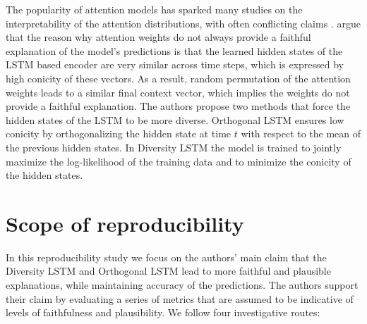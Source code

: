 The popularity of attention models has sparked many studies on the interpretability of the attention distributions, with often conflicting claims \citep{jain-wallace-2019-attention, wiegreffe-pinter-2019-attention, serrano-smith-2019-attention}.
\citet{mohankumar_towards_2020} argue that the reason why attention weights do not always provide  a faithful explanation of the model's predictions is that the learned hidden states of the LSTM based encoder are very similar across time steps, which is expressed by high conicity of these vectors. As a result, random permutation of the attention weights leads to a similar final context vector, which implies the weights do not provide a faithful explanation. The authors propose two methods that force the hidden states of the LSTM to be more diverse. Orthogonal LSTM ensures low conicity by orthogonalizing the hidden state at time $t$ with respect to the mean of the previous hidden states. In Diversity LSTM the model is trained to jointly maximize the log-likelihood of the training data and to minimize the conicity of the hidden states. 
\section{Scope of reproducibility}
In this reproducibility study we focus on the authors' main claim that the Diversity LSTM and Orthogonal LSTM lead to more faithful and plausible explanations, while maintaining accuracy of the predictions.
The authors support their claim by evaluating a series of metrics that are assumed to be indicative of levels of faithfulness and plausibility. We follow four investigative routes:

